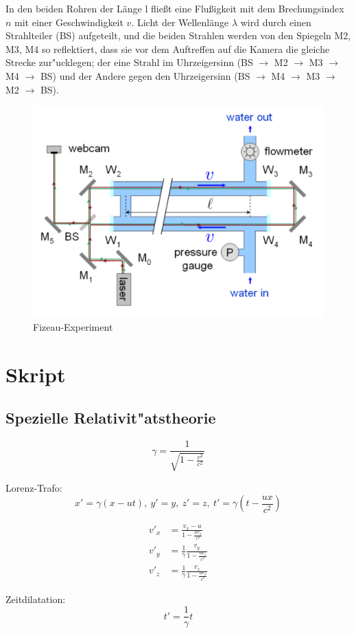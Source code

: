 \documentclass[12pt]{report}
\begin{document}
In den beiden Rohren der Länge l fließt eine Flußigkeit mit dem Brechungsindex $n$ mit einer Geschwindigkeit $v$. Licht der Wellenlänge $\lambda$ wird durch einen Strahlteiler (BS) aufgeteilt, und die beiden Strahlen werden von den Spiegeln M2, M3, M4 so reflektiert, dass sie vor dem Auftreffen auf die Kamera die gleiche Strecke zur"ucklegen; der eine Strahl im Uhrzeigersinn (BS $\to$ M2 $\to$ M3 $\to$ M4 $\to$ BS) und der Andere gegen den Uhrzeigersinn (BS $\to$ M4 $\to$ M3 $\to$ M2 $\to$ BS).

\begin{figure}
\centering
\includegraphics[width=.8\textwidth]{Fizz}
\caption{Fizeau-Experiment}
\label{fizz}
\end{figure}


\chapter{Skript}

\section{Spezielle Relativit"atstheorie}

\[\gamma=\frac{1}{\sqrt{1-\frac{v^2}{c^2}}}\]

Lorenz-Trafo:
\[x'=\gamma(x-ut),\ y'=y,\ z'=z,\ t'=\gamma\left(t-\frac{ux}{c^2}\right)\]

\begin{align*}
v'_x&=\frac{v_x-u}{1-\frac{uv_x}{c^2}}\\
v'_y&=\frac{1}{\gamma}\frac{v_y}{1-\frac{uv_z}{c^2}}\\
v'_z&=\frac{1}{\gamma}\frac{v_z}{1-\frac{uv_x}{c^2}}
\end{align*}

Zeitdilatation:
\[t'=\frac{1}{\gamma}t\]
\end{document}
